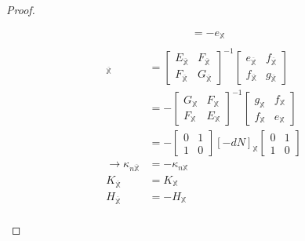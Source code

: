 \documentclass[10pt,a4paper]{article}
\begin{document}
\begin{proof}
\begin{enumerate}
\begin{align*}
&= -e_{\mathbb{X}}\\
\end{align*}
\begin{align*}
[-dN]_{\overline{\mathbb{X}}} &= \left[\begin{array}{cc}E_{\overline{\mathbb{X}}} & F_{\overline{\mathbb{X}}} \\ F_{\overline{\mathbb{X}}} & G_{\overline{\mathbb{X}}}\end{array}\right]^{-1}\left[\begin{array}{cc}e_{\overline{\mathbb{X}}} & f_{\overline{\mathbb{X}}} \\ f_{\overline{\mathbb{X}}} & g_{\overline{\mathbb{X}}}\end{array}\right]\\
&= -\left[\begin{array}{cc}G_{\mathbb{X}} & F_{\mathbb{X}} \\ F_{\mathbb{X}} & E_{\mathbb{X}}\end{array}\right]^{-1}\left[\begin{array}{cc}g_{\mathbb{X}} & f_{\mathbb{X}} \\ f_{\mathbb{X}} & e_{\mathbb{X}}\end{array}\right]\\
&=-\begin{bmatrix}0&1\\1&0\end{bmatrix}[-dN]_{\mathbb{X}}\begin{bmatrix}0&1\\1&0\end{bmatrix}\\
\rightarrow \kappa_{n\overline{\mathbb{X}}} &= -\kappa_{n\mathbb{X}}\\
K_{\overline{\mathbb{X}}} &= K_{\mathbb{X}}\\
H_{\overline{\mathbb{X}}} &= -H_{\mathbb{X}}\\
\end{align*}
\end{enumerate}
\end{proof}
\end{document}
